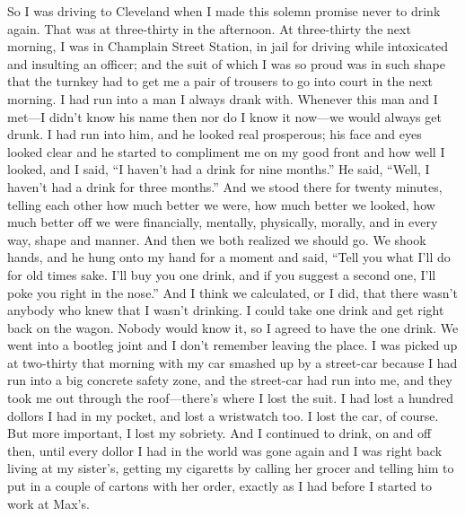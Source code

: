 \begin{biblechapter}
\verse So I was driving to Cleveland when I made this solemn promise 
    never to drink again. 
\verse That was at three-thirty in the afternoon.
\verse At three-thirty the next morning, 
    I was in Champlain Street Station, 
    in jail for driving while intoxicated 
    and insulting an officer; 
    and the suit of which I was so proud was in such shape 
    that the turnkey had to get me a pair of trousers 
    to go into court in the next morning.
\verse I had run into a man I always drank with.
\verse Whenever this man and I met—I 
    didn’t know his name then nor do I know it now—we 
    would always get drunk.
\verse I had run into him, and he looked real prosperous; 
    his face and eyes looked clear 
    and he started to compliment me on my good front 
    and how well I looked, and I said, 
    “I haven’t had a drink for nine months.”
\verse He said, “Well, I haven’t had a drink for three months.”
\verse And we stood there for twenty minutes, 
    telling each other how much better we were, 
    how much better we looked, 
    how much better off we were 
    financially, mentally, physically, morally, 
    and in every way, shape and manner.
\verse And then we both realized we should go.
\verse We shook hands, and he hung onto my hand for a moment and said, 
    “Tell you what I’ll do for old times sake.
    I’ll buy you one drink, 
        and if you suggest a second one, 
        I’ll poke you right in the nose.”
\verse And I think we calculated, or I did, 
    that there wasn’t anybody who knew that I wasn’t drinking. 
\verse I could take one drink and get right back on the wagon.
\verse Nobody would know it, 
    so I agreed to have the one drink.
\verse We went into a bootleg joint 
    and I don’t remember leaving the place.
\verse I was picked up at two-thirty that morning 
    with my car smashed up by a street-car 
    because I had run into a big concrete safety zone, 
    and the street-car had run into me, 
    and they took me out through the roof—there’s 
    where I lost the suit.
\verse I had lost a hundred dollors I had in my pocket, 
    and lost a wristwatch too.
\verse I lost the car, of course.
\verse But more important, I lost my sobriety.
\verse And I continued to drink, on and off then, 
    until every dollor I had in the world was gone again 
    and I was right back living at my sister’s, 
    getting my cigaretts by calling her grocer 
    and telling him to put in a couple of cartons with her order, 
    exactly as I had before I started to work at Max’s.


\end{biblechapter}
